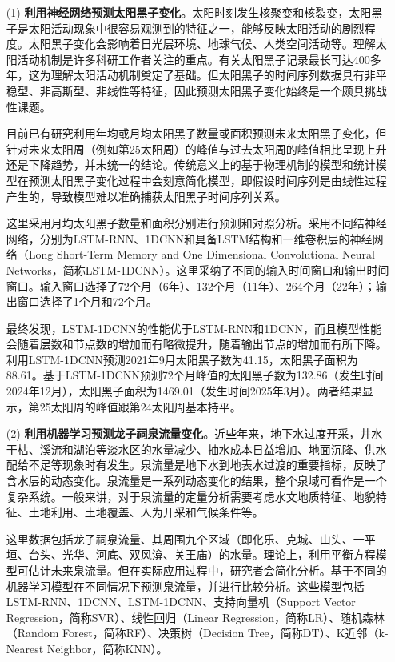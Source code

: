 \begin{enumerate}

  \item[(1)] \textbf{利用神经网络预测太阳黑子变化}。太阳时刻发生核聚变和核裂变，太阳黑子是太阳活动现象中很容易观测到的特征之一，能够反映太阳活动的剧烈程度。太阳黑子变化会影响着日光层环境、地球气候、人类空间活动等。理解太阳活动机制是许多科研工作者关注的重点。有关太阳黑子记录最长可达400多年，这为理解太阳活动机制奠定了基础。但太阳黑子的时间序列数据具有非平稳型、非高斯型、非线性等特征，因此预测太阳黑子变化始终是一个颇具挑战性课题。
  
  目前已有研究利用年均或月均太阳黑子数量或面积预测未来太阳黑子变化，但针对未来太阳周（例如第25太阳周）的峰值与过去太阳周的峰值相比呈现上升还是下降趋势，并未统一的结论。传统意义上的基于物理机制的模型和统计模型在预测太阳黑子变化过程中会刻意简化模型，即假设时间序列是由线性过程产生的，导致模型难以准确捕获太阳黑子时间序列关系。
  
  这里采用月均太阳黑子数量和面积分别进行预测和对照分析。采用不同结神经网络，分别为LSTM-RNN、1DCNN和具备LSTM结构和一维卷积层的神经网络（Long Short-Term Memory and One Dimensional Convolutional Neural Networks，简称LSTM-1DCNN）。这里采纳了不同的输入时间窗口和输出时间窗口。输入窗口选择了72个月（6年）、132个月（11年）、264个月（22年）；输出窗口选择了1个月和72个月。
  
  最终发现，LSTM-1DCNN的性能优于LSTM-RNN和1DCNN，而且模型性能会随着层数和节点数的增加而有略微提升，随着输出节点的增加而有所下降。利用LSTM-1DCNN预测2021年9月太阳黑子数为41.15，太阳黑子面积为88.61。基于LSTM-1DCNN预测72个月峰值的太阳黑子数为132.86（发生时间2024年12月），太阳黑子面积为1469.01（发生时间2025年3月）。两者结果显示，第25太阳周的峰值跟第24太阳周基本持平。

  \item[{(2)}] \textbf{利用机器学习预测龙子祠泉流量变化}。近些年来，地下水过度开采，井水干枯、溪流和湖泊等淡水区的水量减少、抽水成本日益增加、地面沉降、供水配给不足等现象时有发生。泉流量是地下水到地表水过渡的重要指标，反映了含水层的动态变化。泉流量是一系列动态变化的结果，整个泉域可看作是一个复杂系统。一般来讲，对于泉流量的定量分析需要考虑水文地质特征、地貌特征、土地利用、土地覆盖、人为开采和气候条件等。
  
  这里数据包括龙子祠泉流量、其周围九个区域（即化乐、克城、山头、一平垣、台头、光华、河底、双风渰、关王庙）的水量。理论上，利用平衡方程模型可估计未来泉流量。但在实际应用过程中，研究者会简化分析。基于不同的机器学习模型在不同情况下预测泉流量，并进行比较分析。这些模型包括LSTM-RNN、1DCNN、LSTM-1DCNN、支持向量机（Support Vector Regression，简称SVR）、线性回归（Linear Regression，简称LR）、随机森林（Random Forest，简称RF）、决策树（Decision Tree，简称DT）、K近邻（k-Nearest Neighbor，简称KNN）。
  

\end{enumerate}

